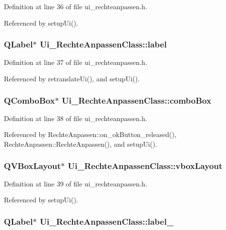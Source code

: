 Definition at line 36 of file ui\_\-rechteanpassen.h.

Referenced by setupUi().\hypertarget{class_ui___rechte_anpassen_class_67687728c1f104991d5217c9feeef212}{
\subsubsection[label]{\setlength{\rightskip}{0pt plus 5cm}QLabel$\ast$ {\bf Ui\_\-RechteAnpassenClass::label}}}
\label{class_ui___rechte_anpassen_class_67687728c1f104991d5217c9feeef212}




Definition at line 37 of file ui\_\-rechteanpassen.h.

Referenced by retranslateUi(), and setupUi().\hypertarget{class_ui___rechte_anpassen_class_e24375bb042c9799f340d1f0c2009323}{
\subsubsection[comboBox]{\setlength{\rightskip}{0pt plus 5cm}QComboBox$\ast$ {\bf Ui\_\-RechteAnpassenClass::comboBox}}}
\label{class_ui___rechte_anpassen_class_e24375bb042c9799f340d1f0c2009323}




Definition at line 38 of file ui\_\-rechteanpassen.h.

Referenced by RechteAnpassen::on\_\-okButton\_\-released(), RechteAnpassen::RechteAnpassen(), and setupUi().\hypertarget{class_ui___rechte_anpassen_class_7c2c836bdf84f3e27d76921432fedd2b}{
\subsubsection[vboxLayout]{\setlength{\rightskip}{0pt plus 5cm}QVBoxLayout$\ast$ {\bf Ui\_\-RechteAnpassenClass::vboxLayout}}}
\label{class_ui___rechte_anpassen_class_7c2c836bdf84f3e27d76921432fedd2b}




Definition at line 39 of file ui\_\-rechteanpassen.h.

Referenced by setupUi().\hypertarget{class_ui___rechte_anpassen_class_1bd4b03ba73aa7d648db2ab783298671}{
\subsubsection[label\_\-6]{\setlength{\rightskip}{0pt plus 5cm}QLabel$\ast$ {\bf Ui\_\-RechteAnpassenClass::label\_}}}
\label{class_ui___rechte_anpassen_class_1bd4b03ba73aa7d648db2ab783298671}




